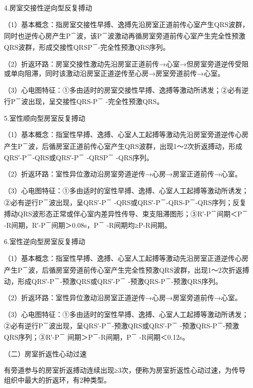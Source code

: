 4.房室交接性逆向型反复搏动

（1）基本概念：指房室交接性早搏、逸搏先沿房室正道前传心室产生QRS波群，同时也逆传心房产生P\textsuperscript{－}波，该P\textsuperscript{－}波激动再循房室旁道前传心室产生完全性预激QRS波群，形成交接性QRSP\textsuperscript{－}-完全性预激QRS序列。

（2）折返环路：房室交接性激动先沿房室正道前传→心室→但房室旁道逆传受阻或单向阻滞，同时该激动沿房室正道逆传至心房→房室旁道前传→心室。

（3）心电图特征：①多由适时的房室交接性早搏、逸搏等激动所诱发；②必有逆行P\textsuperscript{－}波出现，呈交接性QRS-P\textsuperscript{－} -完全性预激QRS。

5.室性顺向型房室反复搏动

（1）基本概念：指室性早搏、逸搏、心室人工起搏等激动先沿房室旁道逆传心房产生P\textsuperscript{－}波，后循房室正道前传心室产生QRS波群，出现1～2次折返搏动，形成QRS′-P\textsuperscript{－}-QRS或QRS′-P\textsuperscript{－} -QRSP\textsuperscript{－} -QRS序列。

（2）折返环路：室性异位激动沿房室旁道逆传→心房→房室正道前传→心室。

（3）心电图特征：①多由适时的室性早搏、逸搏、心室人工起搏等激动所诱发；②必有逆行P\textsuperscript{－}波出现，呈QRS′-P\textsuperscript{－} -QRS或QRS′-P\textsuperscript{－}-QRS-P\textsuperscript{－}-QRS序列；反复搏动QRS波形态正常或伴心室内差异性传导、束支阻滞图形；③R′-P\textsuperscript{－}间期＜P\textsuperscript{－} -R间期，R′-P\textsuperscript{－}间期＞0.08s，P\textsuperscript{－} -R间期均≥P-R间期。

6.室性逆向型房室反复搏动

（1）基本概念：指室性早搏、逸搏、心室人工起搏等激动先沿房室正道逆传心房产生P\textsuperscript{－}波，后循房室旁道前传心室产生完全性预激QRS波群，出现1～2次折返搏动，形成QRS′-P\textsuperscript{－}-预激QRS或QRS′-P\textsuperscript{－} -预激QRS-P\textsuperscript{－}-预激QRS序列。

（2）折返环路：室性异位激动沿房室正道逆传→心房→房室旁道前传→心室。

（3）心电图特征：①多由适时的室性早搏、逸搏、心室人工起搏等激动所诱发；②必有逆行P\textsuperscript{－}波出现，呈QRS′-P\textsuperscript{－}-预激QRS或QRS′-P\textsuperscript{－} -预激QRS-P\textsuperscript{－}-预激QRS序列；③R′-P\textsuperscript{－} 间期＞P\textsuperscript{－}-R间期，P\textsuperscript{－} -R间期＜0.12s。

（二）房室折返性心动过速

有旁道参与的房室折返搏动连续出现≥3次，便称为房室折返性心动过速，为传导组织中最大的折返环，有2种类型。

